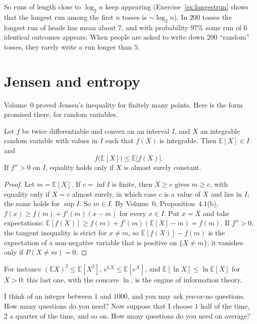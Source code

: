 So runs of length close to $\log_2n$ keep appearing (Exercise~\ref{ex:longestrun} shows that the longest run among the first $n$ tosses is
$\sim\log_2n$). In $200$ tosses the longest run of heads has mean about $7$, and with probability $97\%$ some run of $6$ identical
outcomes appears. When people are asked to write down $200$ ``random'' tosses, they rarely write a run longer than $5$.

\section{Jensen and entropy}\label{sec:entropy}

Volume~0 proved Jensen's inequality for finitely many points. Here is the form promised there, for random variables.

\begin{theorem}[Jensen]\label{thm:jensenprob}
Let $f$ be twice differentiable and convex on an interval $I$, and $X$ an integrable random variable with values in $I$
such that $f(X)$ is integrable. Then $\mathbb E[X]\in I$ and
\[
f\bigl(\mathbb E[X]\bigr)\le\mathbb E\bigl[f(X)\bigr].
\]
If $f''>0$ on $I$, equality holds only if $X$ is almost surely constant.
\end{theorem}
\begin{proof}
Let $m=\mathbb E[X]$. If $c=\inf I$ is finite, then $X\ge c$ gives $m\ge c$, with equality only if $X=c$ almost surely,
in which case $c$ is a value of $X$ and lies in $I$; the same holds for $\sup I$. So $m\in I$. By Volume~0, Proposition~4.1(b), $f(x)\ge f(m)+f'(m)(x-m)$ for every
$x\in I$. Put $x=X$ and take expectations: $\mathbb E[f(X)]\ge f(m)+f'(m)(\mathbb E[X]-m)=f(m)$. If $f''>0$, the tangent inequality is strict for
$x\ne m$, so $\mathbb E[f(X)]-f(m)$ is the expectation of a non-negative variable that is positive on $\{X\ne m\}$; it vanishes only if
$P(X\ne m)=0$.
\end{proof}

For instance $(\mathbb EX)^2\le\mathbb E[X^2]$, $e^{\mathbb E X}\le\mathbb E[e^X]$, and $\mathbb E[\ln X]\le\ln\mathbb E[X]$ for $X>0$: this last one, with the concave $\ln$, is the
engine of information theory.

\begin{think}
I think of an integer between $1$ and $1000$, and you may ask yes-or-no questions. How many questions do you need?
Now suppose that I choose $1$ half of the time, $2$ a quarter of the time, and so on. How many questions do you
need on average?
\end{think}

